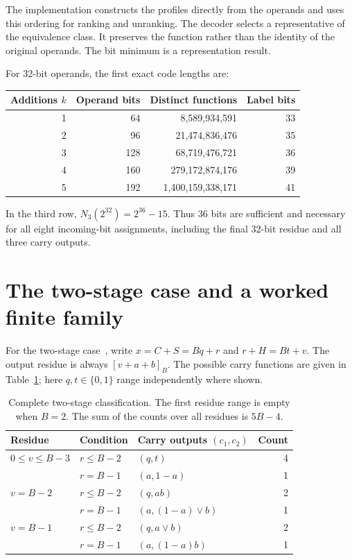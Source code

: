 \documentclass[11pt,a4paper]{article}
\theoremstyle{definition}\newtheorem{definition}[theorem]{Definition}
\begin{document}
The implementation constructs the profiles directly from the operands and
uses this ordering for ranking and unranking. The decoder selects a
representative of the equivalence class. It preserves the function rather
than the identity of the original operands.
The bit minimum is a representation result.

For 32-bit operands, the first exact code lengths are:
\begin{center}
\begin{tabular}{rrrr}
\toprule
Additions $k$ & Operand bits & Distinct functions & Label bits\\
\midrule
1 & 64 & 8,589,934,591 & 33\\
2 & 96 & 21,474,836,476 & 35\\
3 & 128 & 68,719,476,721 & 36\\
4 & 160 & 279,172,874,176 & 39\\
5 & 192 & 1,400,159,338,171 & 41\\
\bottomrule
\end{tabular}
\end{center}
In the third row, $N_3(2^{32})=2^{36}-15$. Thus 36 bits are sufficient
and necessary for all eight incoming-bit assignments, including the final
32-bit residue and all three carry outputs.

\section{The two-stage case and a worked finite family}
For the two-stage case~\cite{two-stage}, write $x=C+S=Bq+r$ and $r+H=Bt+v$.
The output residue is always $[v+a+b]_B$.
The possible carry functions are given in Table~\ref{tab:two}; here
$q,t\in\{0,1\}$ range independently where shown.
\begin{table}[ht]
\centering
\begin{tabular}{lll r}
\toprule
Residue & Condition & Carry outputs $(c_1,c_2)$ & Count\\
\midrule
$0\leq v\leq B-3$ & $r\leq B-2$ & $(q,t)$ & 4\\
 & $r=B-1$ & $(a,1-a)$ & 1\\
$v=B-2$ & $r\leq B-2$ & $(q,ab)$ & 2\\
 & $r=B-1$ & $(a,(1-a)\lor b)$ & 1\\
$v=B-1$ & $r\leq B-2$ & $(q,a\lor b)$ & 2\\
 & $r=B-1$ & $(a,(1-a)b)$ & 1\\
\bottomrule
\end{tabular}
\caption{Complete two-stage classification. The first residue range is empty
when $B=2$. The sum of the counts over all residues is $5B-4$.}
\label{tab:two}
\end{table}
\end{document}
